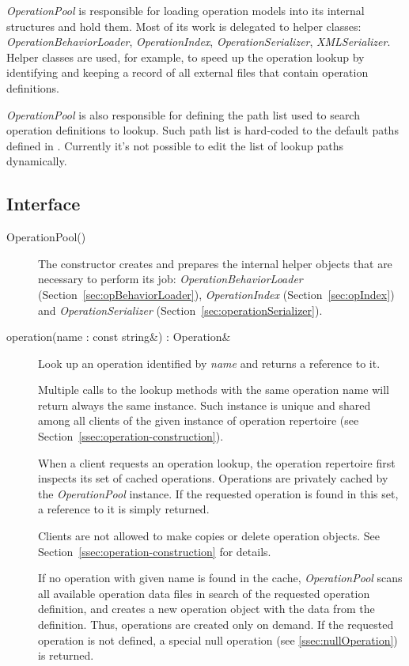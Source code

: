 \documentclass[a4paper,twoside]{tce}
\begin{document}
\emph{OperationPool} is responsible for loading operation models into its
internal structures and hold them.  Most of its work is delegated to helper
classes: \emph{OperationBehaviorLoader}, \emph{OperationIndex},
\emph{OperationSerializer}, \emph{XMLSerializer}.  Helper classes are used,
for example, to speed up the operation lookup by identifying and keeping a
record of all external files that contain operation definitions.

\emph{OperationPool} is also responsible for defining the path list used to
search operation definitions to lookup.  Such path list is hard-coded to the
default paths defined in \cite{OSAL-specs}. Currently it's not possible to
edit the list of lookup paths dynamically.

\subsection{Interface}

\begin{description}

\item[OperationPool()]%

  The constructor creates and prepares the internal helper objects that are
  necessary to perform its job: \emph{OperationBehaviorLoader}
  (Section~\ref{sec:opBehaviorLoader}), \emph{OperationIndex}
  (Section~\ref{sec:opIndex}) and \emph{OperationSerializer}
  (Section~\ref{sec:operationSerializer}).

\item[operation(name : const string\&) : Operation\&] %

  Look up an operation identified by \emph{name} and returns a reference to
  it.

  Multiple calls to the lookup methods with the same operation name will
  return always the same instance.  Such instance is unique and shared among
  all clients of the given instance of operation repertoire (see
  Section~\ref{ssec:operation-construction}).

  When a client requests an operation lookup, the operation repertoire first
  inspects its set of cached operations.  Operations are privately cached by
  the \emph{OperationPool} instance.  If the requested operation is found in
  this set, a reference to it is simply returned.

  Clients are not allowed to make copies or delete operation objects.  See
  Section~\ref{ssec:operation-construction} for details.

  If no operation with given name is found in the cache,
  \emph{OperationPool} scans all available operation data files in search of
  the requested operation definition, and creates a new operation object
  with the data from the definition.  Thus, operations are created only on
  demand.  If the requested operation is not defined, a special null
  operation (see \ref{ssec:nullOperation}) is returned.

\end{description}
\end{document}

